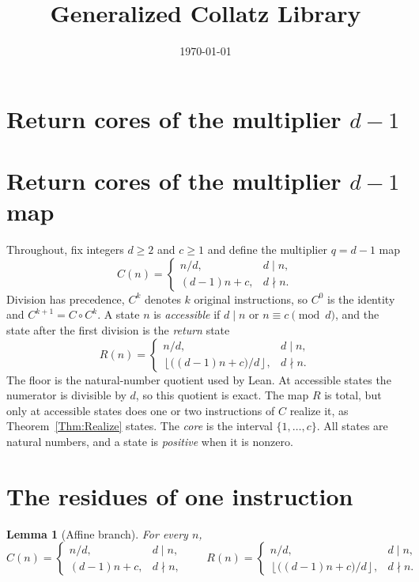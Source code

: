 \documentclass[11pt,letterpaper]{article}
\title{Generalized Collatz Library}
\author{}
\date{\today}
\newtheorem{lemma}[theorem]{Lemma}
\begin{document}
\maketitle
\section*{Return cores of the multiplier \(d-1\)}

\section*{Return cores of the multiplier \(d-1\) map}

Throughout, fix integers \(d\ge2\) and \(c\ge1\) and define the multiplier
\(q=d-1\) map
\[
 C(n)=\begin{cases} n/d, & d\mid n,\\ (d-1)n+c, & d\nmid n.\end{cases}
\]
Division has precedence, \(C^{k}\) denotes \(k\) original instructions, so
\(C^{0}\) is the identity and \(C^{k+1}=C\circ C^{k}\). A state \(n\) is
\emph{accessible} if \(d\mid n\) or \(n\equiv c\pmod d\), and the state after
the first division is the \emph{return} state
\[
 R(n)=\begin{cases} n/d, & d\mid n,\\ \left\lfloor\bigl((d-1)n+c\bigr)/d\right\rfloor, & d\nmid n.\end{cases}
\]
The floor is the natural-number quotient used by Lean. At accessible states
the numerator is divisible by \(d\), so this quotient is exact.
The map \(R\) is total, but only at accessible states does one or two
instructions of \(C\) realize it, as Theorem~\ref{Thm:Realize} states. The
\emph{core} is the interval \(\{1,\dots,c\}\). All states are natural numbers,
and a state is \emph{positive} when it is nonzero.

\section{The residues of one instruction}

\begin{lemma}[Affine branch]\label{Lem:AffineBranch}
For every \(n\),
\[
 C(n)=\begin{cases} n/d, & d\mid n,\\ (d-1)n+c, & d\nmid n,\end{cases}
 \qquad
 R(n)=\begin{cases} n/d, & d\mid n,\\ \left\lfloor\bigl((d-1)n+c\bigr)/d\right\rfloor, & d\nmid n.\end{cases}
\]
\end{lemma}
\end{document}
